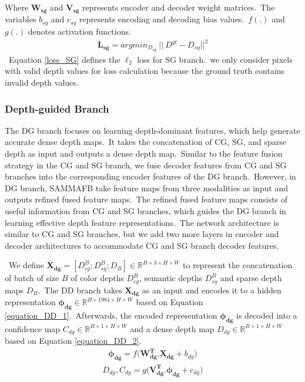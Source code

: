 \documentclass{ieeeaccess}
\begin{document}
Where $\mathbf{W_{sg}}$ and $\mathbf{V_{sg}}$ represents encoder and decoder weight matrices.~The variables $b_{sg}$ and $c_{sg}$ represents encoding and decoding bias values.~$f(.)$ and $g(.)$ denotes activation functions.
\begin{equation}
    \begin{aligned}
            \mathbf{L_{sg}} =   argmin_{D_{sg}} \ || \ D ^{gt} -D_{sg} ||^2
    \end{aligned}
    \label{loss_SG}
\end{equation}
~Equation \ref{loss_SG} defines the $\ell_2$ loss for SG branch.~we only consider pixels with valid depth values for loss calculation because the ground truth contains invalid depth values.

\subsubsection{Depth-guided Branch}

The DG branch focuses on learning depth-dominant features, which help generate accurate dense depth maps.~It takes the concatenation of CG, SG, and sparse depth as input and outputs a dense depth map.~Similar to the feature fusion strategy in the CG and SG branch, we fuse decoder features from CG and SG branches into the corresponding encoder features of the DG branch.~However, in DG branch, SAMMAFB take feature maps from three modalities as input and outputs refined fused feature maps.~The refined fused feature maps consists of useful information from CG and SG branches, which guides the DG branch in learning effective depth feature representations.~The network architecture is similar to CG and SG branches, but we add two more layers in encoder and decoder architectures to accommodate CG and SG branch decoder features.




~We define $\mathbf{X_{dg}} =  \left[D_{cg}^{B};D_{sg}^{B};D_B \right]  \in \mathbb{R}^{B \times 3 \times H \times W}$ to represent the concatenation of batch of size $B$ of color depths $D_{cg}^B$, semantic depths $D_{sg}^B$ and sparse depth maps $D_B$.~The DD branch takes $\mathbf{X_{dg}}$ as an input and encodes it to a hidden representation $\mathbf{\phi_{dg} }  \in \mathbb{R}^{B \times 1984 \times H \times W}$ based on Equation \ref{equation_DD_1}.~Afterwards, the encoded representation $\mathbf{\phi_{dg}}$ is decoded into a confidence map $C_{dg}  \in \mathbb{R}^{B \times 1 \times H \times W}$ and a dense depth map $D_{dg}  \in \mathbb{R}^{B \times 1 \times H \times W}$ based on Equation \ref{equation_DD_2}. 
\begin{equation}
    \begin{aligned}
            \mathbf{\phi_{dg}} =   f\mathbf{(W_{dg}^T.X_{dg}} + b_{dg})
    \end{aligned}
    \label{equation_DD_1}
\end{equation}
\begin{equation}
    \begin{aligned}
            D_{dg}, C_{dg} =   g\mathbf{(V_{dg}^T.\phi_{dg}} + c_{dg})
    \end{aligned}
    \label{equation_DD_2}
\end{equation}
\end{document}
